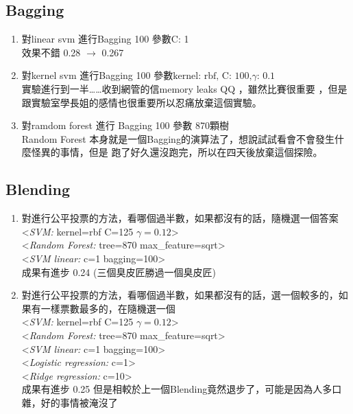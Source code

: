 \documentclass[12pt]{article}
\theoremstyle{definition}
\theoremstyle{remark}
\begin{document}
\subsection{Bagging}
\begin{enumerate}
  \item 對linear svm 進行Bagging 100 參數C: 1 \\
    效果不錯 0.28 $ \to $ 0.267
  \item 對kernel svm 進行Bagging 100  參數$ \text{kernel: rbf, C: 100,} \gamma \text{: 0.1} $\\
    實驗進行到一半\dots\dots 收到網管的信memory leaks QQ ，雖然比賽很重要
    ，但是跟實驗室學長姐的感情也很重要所以忍痛放棄這個實驗。
  \item 對ramdom forest 進行 Bagging 100 參數 870顆樹\\
    Random Forest 本身就是一個Bagging的演算法了，想說試試看會不會發生什麼怪異的事情，但是
    跑了好久還沒跑完，所以在四天後放棄這個探險。
\end{enumerate}
\subsection{Blending}
\begin{enumerate}
  \item 對進行公平投票的方法，看哪個過半數，如果都沒有的話，隨機選一個答案\\
    <{\em SVM:\/} kernel=rbf C=125 $ \gamma = 0.12 $>\\ 
    <{\em Random Forest:\/} tree=870 max\_feature=sqrt> \\
    <{\em SVM linear:\/} c=1 bagging=100>\\
    成果有進步 0.24 (三個臭皮匠勝過一個臭皮匠)
  \item 對進行公平投票的方法，看哪個過半數，如果都沒有的話，選一個較多的，如果有一樣票數最多的，在隨機選一個\\
    <{\em SVM:\/} kernel=rbf C=125 $ \gamma = 0.12 $>\\ 
    <{\em Random Forest:\/} tree=870 max\_feature=sqrt> \\
    <{\em SVM linear:\/} c=1 bagging=100>\\
    <{\em Logistic regression:\/} c=1>\\
    <{\em Ridge regression:\/} c=10>\\
    成果有進步 0.25 但是相較於上一個Blending竟然退步了，可能是因為人多口雜，好的事情被淹沒了
\end{enumerate}
\end{document}

